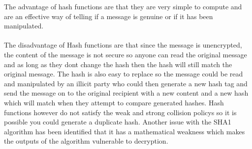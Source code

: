 \documentclass[a4paper, twoside, 11pt]{article}
\begin{document}
The advantage of hash functions are that they are very simple to compute and are an effective way of telling if a message is genuine or if it has been manipulated.\\
\\
The disadvantage of Hash functions are that since the message is unencrypted, the content of the message is not secure so anyone can read the original message and as long as they dont change the hash then the hash will still match the original message. The hash is also easy to replace so the message could be read and manipulated by an illicit party who could then generate a new hash tag and send the message on to the original recipient with a new content and a new hash which will match when they attempt to compare generated hashes. Hash functions however do not satisfy the weak and strong collision policys so it is possible you could generate a duplicate hash. Another issue with the SHA1 algorithm has been identified that it has a mathematical weakness which makes the outputs of the algorithm vulnerable to decryption.
\end{document}
